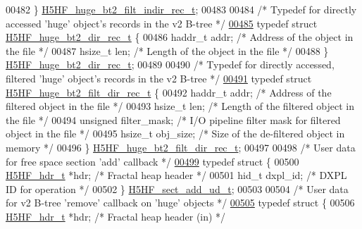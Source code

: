 \begin{DoxyCode}
00482 \} \hyperlink{struct_h5_h_f__huge__bt2__filt__indir__rec__t}{H5HF\_huge\_bt2\_filt\_indir\_rec\_t};
00483 
00484 \textcolor{comment}{/* Typedef for directly accessed 'huge' object's records in the v2 B-tree */}
\hyperlink{struct_h5_h_f__huge__bt2__dir__rec__t}{00485} \textcolor{keyword}{typedef} \textcolor{keyword}{struct }\hyperlink{struct_h5_h_f__huge__bt2__dir__rec__t}{H5HF\_huge\_bt2\_dir\_rec\_t} \{
00486     haddr\_t addr;       \textcolor{comment}{/* Address of the object in the file */}
00487     hsize\_t len;        \textcolor{comment}{/* Length of the object in the file */}
00488 \} \hyperlink{struct_h5_h_f__huge__bt2__dir__rec__t}{H5HF\_huge\_bt2\_dir\_rec\_t};
00489 
00490 \textcolor{comment}{/* Typedef for directly accessed, filtered 'huge' object's records in the v2 B-tree */}
\hyperlink{struct_h5_h_f__huge__bt2__filt__dir__rec__t}{00491} \textcolor{keyword}{typedef} \textcolor{keyword}{struct }\hyperlink{struct_h5_h_f__huge__bt2__filt__dir__rec__t}{H5HF\_huge\_bt2\_filt\_dir\_rec\_t} \{
00492     haddr\_t addr;       \textcolor{comment}{/* Address of the filtered object in the file */}
00493     hsize\_t len;        \textcolor{comment}{/* Length of the filtered object in the file */}
00494     \textcolor{keywordtype}{unsigned} filter\_mask;   \textcolor{comment}{/* I/O pipeline filter mask for filtered object in the file */}
00495     hsize\_t obj\_size;   \textcolor{comment}{/* Size of the de-filtered object in memory */}
00496 \} \hyperlink{struct_h5_h_f__huge__bt2__filt__dir__rec__t}{H5HF\_huge\_bt2\_filt\_dir\_rec\_t};
00497 
00498 \textcolor{comment}{/* User data for free space section 'add' callback */}
\hyperlink{struct_h5_h_f__sect__add__ud__t}{00499} \textcolor{keyword}{typedef} \textcolor{keyword}{struct }\{
00500     \hyperlink{struct_h5_h_f__hdr__t}{H5HF\_hdr\_t} *hdr;            \textcolor{comment}{/* Fractal heap header */}
00501     hid\_t dxpl\_id;              \textcolor{comment}{/* DXPL ID for operation */}
00502 \} \hyperlink{struct_h5_h_f__sect__add__ud__t}{H5HF\_sect\_add\_ud\_t};
00503 
00504 \textcolor{comment}{/* User data for v2 B-tree 'remove' callback on 'huge' objects */}
\hyperlink{struct_h5_h_f__huge__remove__ud__t}{00505} \textcolor{keyword}{typedef} \textcolor{keyword}{struct }\{
00506     \hyperlink{struct_h5_h_f__hdr__t}{H5HF\_hdr\_t} *hdr;            \textcolor{comment}{/* Fractal heap header (in) */}

\end{DoxyCode}
